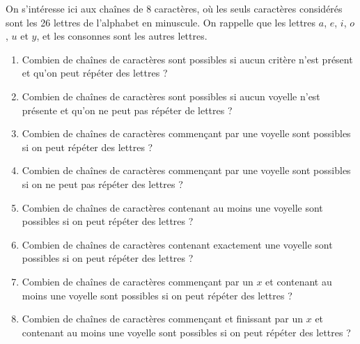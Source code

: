 \documentclass[a4paper,11pt]{article}
\begin{document}
On s'intéresse ici aux chaînes de 8 caractères, où les seuls caractères considérés sont les 26 lettres de l'alphabet en minuscule. On rappelle que les lettres $a$, $e$, $i$, $o$, $u$ et $y$, et les consonnes sont les autres lettres.

\begin{enumerate}
\item Combien de chaînes de caractères sont possibles si aucun critère n'est présent et qu'on peut répéter des lettres ?

\item Combien de chaînes de caractères sont possibles si aucun voyelle n'est présente et qu'on ne peut pas répéter de lettres ?

\item Combien de chaînes de caractères commençant par une voyelle sont possibles si on peut répéter des lettres ?

\item Combien de chaînes de caractères commençant par une voyelle sont possibles si on ne peut pas répéter des lettres ?

\item Combien de chaînes de caractères contenant au moins une voyelle sont possibles si on peut répéter des lettres ?

\item Combien de chaînes de caractères contenant exactement une voyelle sont possibles si on peut répéter des lettres ?

\item Combien de chaînes de caractères commençant par un $x$ et contenant au moins une voyelle sont possibles si on peut répéter des lettres ?

\item Combien de chaînes de caractères commençant et finissant par un $x$ et contenant au moins une voyelle sont possibles si on peut répéter des lettres ?
\end{enumerate}
\end{document}

